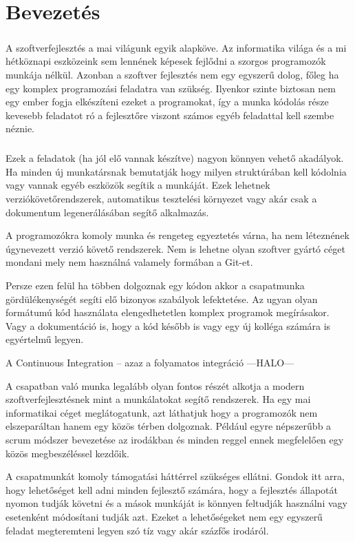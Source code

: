 \chapter{Bevezetés}
\label{chapIntroduction}
\paragraph{}
A szoftverfejlesztés a mai világunk egyik alapköve. 
Az informatika világa és a mi hétköznapi eszközeink sem lennének képesek fejlődni a szorgos programozók munkája nélkül. 
Azonban a szoftver fejlesztés nem egy egyszerű dolog, főleg ha egy komplex programozási feladatra van szükség. 
Ilyenkor szinte biztosan nem egy ember fogja elkészíteni ezeket a programokat, így a munka kódolás része kevesebb feladatot ró a fejlesztőre viszont számos egyéb feladattal kell szembe néznie.

\paragraph{}
Ezek a feladatok (ha jól elő vannak készítve) nagyon könnyen vehető akadályok. 
Ha minden új munkatársnak bemutatják hogy milyen struktúrában kell kódolnia vagy vannak egyéb eszközök segítik a munkáját.
Ezek lehetnek verziókövetőrendszerek, automatikus tesztelési környezet vagy akár csak a dokumentum legenerálásában segítő alkalmazás.

A programozókra komoly munka és rengeteg egyeztetés várna, ha nem léteznének úgynevezett verzió követő rendszerek.
Nem is lehetne olyan szoftver gyártó céget mondani mely nem használná valamely formában a Git-et.

Persze ezen felül ha többen dolgoznak egy kódon akkor a csapatmunka gördülékenységét segíti elő bizonyos szabályok lefektetése.
Az ugyan olyan formátumú kód használata elengedhetetlen komplex programok megírásakor.
Vagy a dokumentáció is, hogy a kód később is vagy egy új kolléga számára is egyértelmű legyen.

A Continuous Integration – azaz a folyamatos integráció
---HALO---

A csapatban való munka legalább olyan fontos részét alkotja a modern szoftverfejlesztésnek mint a munkálatokat segítő rendszerek.
Ha egy mai informatikai céget meglátogatunk, azt láthatjuk hogy a programozók nem elszeparáltan hanem egy közös térben dolgoznak.
Például egyre népszerűbb a scrum módszer bevezetése az irodákban és minden reggel ennek megfelelően egy közös megbeszéléssel kezdőik.

A csapatmunkát komoly támogatási háttérrel szükséges ellátni. 
Gondok itt arra, hogy lehetőséget kell adni minden fejlesztő számára, hogy a fejlesztés állapotát nyomon tudják követni és a mások munkáját is könnyen feltudják használni vagy esetenként módosítani tudják azt. 
Ezeket a lehetőségeket nem egy egyszerű feladat megteremteni legyen szó tíz vagy akár százfős irodáról.

